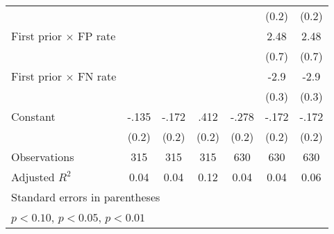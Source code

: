 \begin{table}[htbp]
\begin{tabular}{l*{6}{c}}
                &                  &                  &                  &                  &    (0.2)         &    (0.2)         \\
First prior $\times$ FP rate&                  &                  &                  &                  &     2.48\sym{***}&     2.48\sym{***}\\
                &                  &                  &                  &                  &    (0.7)         &    (0.7)         \\
First prior $\times$ FN rate&                  &                  &                  &                  &     -2.9\sym{***}&     -2.9\sym{***}\\
                &                  &                  &                  &                  &    (0.3)         &    (0.3)         \\
Constant        &    -.135         &    -.172         &     .412\sym{*}  &    -.278         &    -.172         &    -.172         \\
                &    (0.2)         &    (0.2)         &    (0.2)         &    (0.2)         &    (0.2)         &    (0.2)         \\
\hline
Observations    &      315         &      315         &      315         &      630         &      630         &      630         \\
Adjusted \(R^{2}\)&     0.04         &     0.04         &     0.12         &     0.04         &     0.04         &     0.06         \\
\hline\hline
\multicolumn{7}{l}{\footnotesize Standard errors in parentheses}\\
\multicolumn{7}{l}{\footnotesize \sym{*} \(p<0.10\), \sym{**} \(p<0.05\), \sym{***} \(p<0.01\)}\\
\end{tabular}
\end{table}
